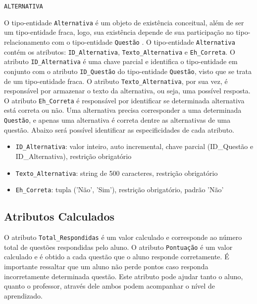 \documentclass[12pt,a4paper]{article}
\begin{document}
\vspace{0.5cm}
\begin{center}
    \texttt{ALTERNATIVA}
\end{center}

O tipo-entidade \texttt{Alternativa} é um objeto de existência conceitual, além de ser um tipo-entidade fraca, logo, sua existência depende de sua participação no tipo-relacionamento com o tipo-entidade \texttt{Questão} . O tipo-entidade \texttt{Alternativa} contém os atributos: \texttt{ID\_Alternativa}, \texttt{Texto\_Alternativa} e \texttt{Eh\_Correta}. O atributo \texttt{ID\_Alternativa} é uma chave parcial e identifica o tipo-entidade em conjunto com o atributo \texttt{ID\_Questão} do tipo-entidade \texttt{Questão}, visto que se trata de um tipo-entidade fraca. O atributo \texttt{Texto\_Alternativa}, por sua vez, é responsável por armazenar o texto da alternativa, ou seja, uma possível resposta.\\

O atributo \texttt{Eh\_Correta} é responsável por identificar se determinada alternativa está correta ou não. Uma alternativa precisa corresponder a uma determinada \texttt{Questão}, e apenas uma alternativa é correta dentre as alternativas de uma questão. Abaixo será possível identificar as especificidades de cada atributo. \\

\begin{itemize}
    \item \texttt{ID\_Alternativa}: valor inteiro, auto incremental, chave parcial (ID\_Questão e ID\_Alternativa), restrição obrigatório
    \item \texttt{Texto\_Alternativa}: string de 500 caracteres, restrição obrigatório
    \item \texttt{Eh\_Correta}: tupla ('Não', 'Sim'), restrição obrigatório, padrão 'Não'
\end{itemize}

\subsection{Atributos Calculados}

O atributo {\texttt{Total\_Respondidas}} é um valor calculado e corresponde ao número total de questões respondidas pelo aluno. O atributo {\texttt{Pontuação}} é um valor calculado e é obtido a cada questão que o aluno responde corretamente. É importante ressaltar que um aluno não perde pontos caso responda incorretamente determinada questão. Este atributo pode ajudar tanto o aluno, quanto o professor, através dele ambos podem acompanhar o nível de aprendizado.\\
\end{document}
